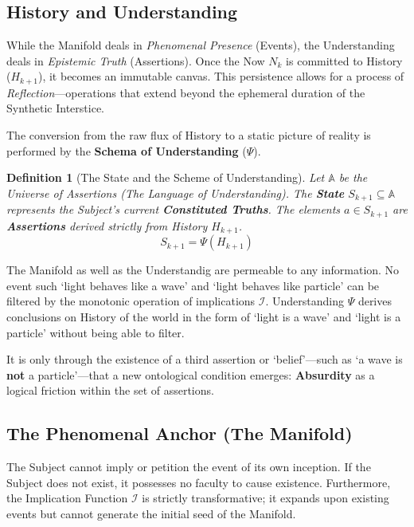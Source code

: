 \documentclass[11pt, a4paper]{article}
\theoremstyle{formalism}
\newtheorem{formalism}{Definition}
\begin{document}
{\subsection{History and Understanding}

While the Manifold deals in \textit{Phenomenal Presence} (Events), the
Understanding deals in \textit{Epistemic Truth} (Assertions). Once the Now
$N_k$ is committed to History ($H_{k+1}$), it becomes an immutable canvas.
This persistence allows for a process of {\it Reflection\/}---operations that
extend beyond the ephemeral duration of the Synthetic Interstice.

The conversion from the raw flux of History to a static picture of reality is
performed by the \textbf{Schema of Understanding} ($\Psi$).

\begin{formalism}[The State and the Scheme of Understanding]
Let $\mathbb{A}$ be the Universe of Assertions (The Language of Understanding). 
The \textbf{State} $S_{k+1} \subseteq \mathbb{A}$ represents the Subject's current 
\textbf{Constituted Truths}. The elements $a \in S_{k+1}$ are \textbf{Assertions} 
derived strictly from History $H_{k+1}$.
\begin{equation}
    S_{k+1} = \Psi(H_{k+1})
\end{equation}
\end{formalism}

The Manifold as well as the Understandig are permeable to any information. 
No event such `light behaves like a wave' and `light behaves like particle' 
can be filtered by the monotonic operation of implications $\mathcal{I}$.
Understanding $\Psi$ derives conclusions on History of the world in the
form of `light is a wave' and `light is a particle' without being able
to filter. 

It is only through the existence of a third assertion or `belief'---such as `a
wave is \textbf{not} a particle'---that a new ontological condition emerges:
\textbf{Absurdity} as a logical friction within the set of assertions.

\subsection{The Phenomenal Anchor (The Manifold)}

The Subject cannot imply or petition the event of its own inception. If the
Subject does not exist, it possesses no faculty to cause existence.
Furthermore, the Implication Function $\mathcal{I}$ is strictly transformative;
it expands upon existing events but cannot generate the initial seed of the
Manifold.

}
\end{document}
